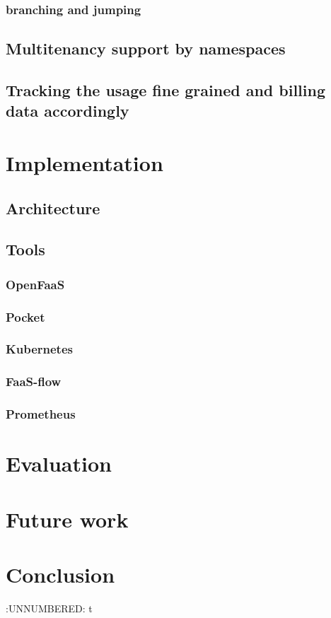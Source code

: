 \documentclass[12pt,titlepage]{article}
\begin{document}
\subsubsection{branching and jumping}
\label{sec:org0713569}
\subsection{Multitenancy support by namespaces}
\label{sec:orgc705e44}
\subsection{Tracking the usage fine grained and billing data accordingly}
\label{sec:org4f92a19}
\section{Implementation}
\label{sec:org82227af}
\subsection{Architecture}
\label{sec:orgaf976c7}
\subsection{Tools}
\label{sec:orgf69c98f}
\subsubsection{OpenFaaS}
\label{sec:org5351e96}
\subsubsection{Pocket}
\label{sec:orgb25dc72}
\subsubsection{Kubernetes}
\label{sec:org242b5f4}
\subsubsection{FaaS-flow}
\label{sec:org4952c37}
\subsubsection{Prometheus}
\label{sec:orge1fa1d1}
\section{Evaluation}
\label{sec:orgc39e987}
\section{Future work}
\label{sec:org8795e6a}
\section{Conclusion}
\label{sec:orgfc4859a}


:UNNUMBERED: t
\end{document}
